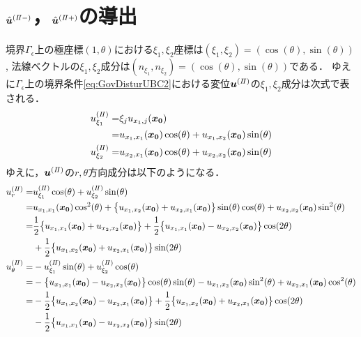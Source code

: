 \section{$\hat{\bm{u}}^{(I\hspace{-.15em}I-)}$，$\hat{\bm{u}}^{(I\hspace{-.15em}I+)}$の導出}

境界$\Gamma_{\epsilon}$上の極座標$(1,\theta)$における$\xi_1,\xi_2$座標は$(\xi_1,\xi_2)=(\cos(\theta),\sin(\theta))$,
法線ベクトルの$\xi_1,\xi_2$成分は$(n_{\xi_1},n_{\xi_2})=(\cos(\theta),\sin(\theta))$である．
ゆえに$\Gamma_\epsilon$上の境界条件\eqref{eq:GovDisturUBC2}における変位$\bm{u}^{(I\hspace{-.15em}I)}$の$\xi_1,\xi_2$成分は次式で表される．
\begin{align}
	u_{\xi_1}^{(I\hspace{-.15em}I)}=&\xi_{j} u_{x_{1},j}(\bm{x_{0}})
	\nonumber
	\\
	=&u_{x_{1},x_{1}}(\bm{x_{0}})\cos(\theta)+u_{x_{1},x_{2}}(\bm{x_{0}})\sin(\theta)
	\\
	u_{\xi_2}^{(I\hspace{-.15em}I)}=
	&u_{x_{2},x_{1}}(\bm{x_{0}})\cos(\theta)+u_{x_{2},x_{2}}(\bm{x_{0}})\sin(\theta)
\end{align}
ゆえに，$\bm{u}^{(I\hspace{-.15em}I)}$の$r,\theta$方向成分は以下のようになる．
\begin{align}
	u_{r}^{(I\hspace{-.15em}I)}=
		&u_{\xi_1}^{(I\hspace{-.15em}I)}\cos(\theta)+u_{\xi_2}^{(I\hspace{-.15em}I)}\sin(\theta)
		\nonumber
		\\
		=&u_{x_{1},x_{1}}(\bm{x_{0}})\cos^2(\theta)+\bigl\{u_{x_{1},x_{2}}(\bm{x_{0}})
		+u_{x_{2},x_{1}}(\bm{x_{0}})\bigr\}\sin(\theta)\cos(\theta)
		+u_{x_{2},x_{2}}(\bm{x_{0}})\sin^2(\theta)
		\nonumber
		\\
		=&\frac{1}{2}\bigl\{u_{x_{1},x_{1}}(\bm{x_{0}})+u_{x_{2},x_{2}}(\bm{x_{0}})\bigr\}
		+\frac{1}{2}\bigl\{u_{x_{1},x_{1}}(\bm{x_{0}})-u_{x_{2},x_{2}}(\bm{x_{0}})\bigr\}\cos(2\theta)
		\nonumber
		\\
		&+\frac{1}{2}\bigl\{u_{x_{1},x_{2}}(\bm{x_{0}})+u_{x_{2},x_{1}}(\bm{x_{0}})\bigr\}\sin(2\theta)
		\\
	u_{\theta}^{(I\hspace{-.15em}I)}=
		&-u_{\xi_1}^{(I\hspace{-.15em}I)}\sin(\theta)+u_{\xi_2}^{(I\hspace{-.15em}I)}\cos(\theta)
		\nonumber
		\\
		=&-\bigl\{u_{x_{1},x_{1}}(\bm{x_{0}})-u_{x_{2},x_{2}}(\bm{x_{0}})\bigr\}\cos(\theta)\sin(\theta)
		-u_{x_{1},x_{2}}(\bm{x_{0}})\sin^2(\theta)+u_{x_{2},x_{1}}(\bm{x_{0}})\cos^2(\theta)
		\nonumber
		\\
		=&-\frac{1}{2}\bigl\{u_{x_{1},x_{2}}(\bm{x_{0}})-u_{x_{2},x_{1}}(\bm{x_{0}})\bigr\}
		+\frac{1}{2}\bigl\{u_{x_{1},x_{2}}(\bm{x_{0}})+u_{x_{2},x_{1}}(\bm{x_{0}})\bigr\}\cos(2\theta)
		\nonumber
		\\
		&-\frac{1}{2}\bigl\{u_{x_{1},x_{1}}(\bm{x_{0}})-u_{x_{2},x_{2}}(\bm{x_{0}})\bigr\}\sin(2\theta)
\end{align}

